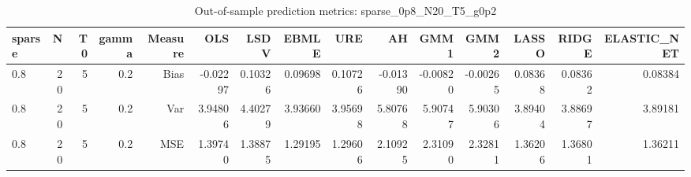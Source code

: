 \begin{table}[!htbp]\centering
\caption{Out-of-sample prediction metrics: sparse_0p8_N20_T5_g0p2}
\label{tab:table3_sparse_0p8_N20_T5_g0p2}
\begin{tabular}{lrrrrrrrrrrrrrr}
\hline
sparse & N & T0 & gamma & Measure & OLS & LSDV & EBMLE & URE & AH & GMM1 & GMM2 & LASSO & RIDGE & ELASTIC_NET \\
\hline
0.8 & 20 & 5 & 0.2 & Bias & -0.02297 & 0.10326 & 0.09698 & 0.10726 & -0.01390 & -0.00820 & -0.00265 & 0.08368 & 0.08362 & 0.08384 \\
0.8 & 20 & 5 & 0.2 & Var & 3.94806 & 4.40279 & 3.93660 & 3.95698 & 5.80768 & 5.90747 & 5.90306 & 3.89404 & 3.88697 & 3.89181 \\
0.8 & 20 & 5 & 0.2 & MSE & 1.39740 & 1.38875 & 1.29195 & 1.29606 & 2.10925 & 2.31090 & 2.32811 & 1.36206 & 1.36801 & 1.36211 \\
\hline
\end{tabular}
\end{table}

